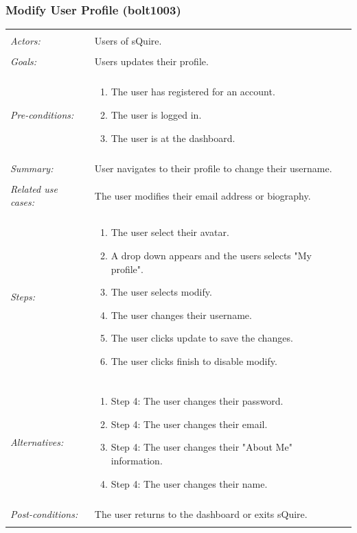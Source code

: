 \documentclass[11pt]{report}
\begin{document}
\subsubsection{Modify User Profile (bolt1003)}
\begin{tabular}{ p{2cm} p{12cm} }
 \hline
 \\
 \textit{Actors:} & Users of sQuire. \\ 
 \\
 \textit{Goals:} & Users updates their profile. \\
 \\
 \textit{Pre-conditions:} & \begin{enumerate}
  \item The user has registered for an account.
  \item The user is logged in.
  \item The user is at the dashboard.
 \end{enumerate} \\
 \\
 \textit{Summary:} & User navigates to their profile to change their username.\\ 
 \\
 \textit{Related use cases:} & The user modifies their email address or biography. \\ 
 \\
 \textit{Steps:} & \begin{enumerate}
  \item The user select their avatar.
  \item A drop down appears and the users selects "My profile".
  \item The user selects modify. 
  \item The user changes their username.
  \item The user clicks update to save the changes.
  \item The user clicks finish to disable modify.
 \end{enumerate} \\
 \\
 \textit{Alternatives:} & \begin{enumerate} 
  \item Step 4: The user changes their password.
  \item Step 4: The user changes their email.
  \item Step 4: The user changes their "About Me" information.
  \item Step 4: The user changes their name.
 \end{enumerate} \\
 \\
 \textit{Post-conditions:} & The user returns to the dashboard or exits sQuire. \\
 \\
\hline
\end{tabular}
\end{document}
